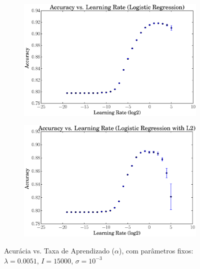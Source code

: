 \documentclass[a4paper, 12pt]{article}
\begin{document}
\begin{figure}[htpb]
\begin{subfigure}[htpb]{0.45\textwidth}
        \caption{}
        \label{fig:rate_linregL2}
    \end{subfigure}
    \hfill %
    \begin{subfigure}[htpb]{0.45\textwidth}
        \includegraphics[width=\textwidth]{acc_vs_rate_logreg}
        \caption{}
        \label{fig:rate_logreg}
    \end{subfigure}
    \begin{subfigure}[htpb]{0.45\textwidth}
        \includegraphics[width=\textwidth]{acc_vs_rate_logregL2}
        \caption{}
        \label{fig:rate_logregL2}
    \end{subfigure}
    \caption{Acurácia vs. Taxa de Aprendizado ($\alpha$), com parâmetros
    fixos: $\lambda=0.0051$, $I=15000$, $\sigma=10^{-3}$}\label{fig:rate}
\end{figure}
\end{document}
